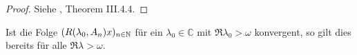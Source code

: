 
\begin{proof}
Siehe \cite{pazy_1983}, Theorem III.4.4.
\end{proof}

\begin{bem}
Ist die Folge $(R(\lambda_0, A_n)x)_{n\in\mathbb{N}}$ für ein  $\lambda_0\in\mathbb C$ mit $\mathfrak R\lambda_0 >\omega$ konvergent, so gilt dies bereits für alle $\mathfrak R\lambda >\omega$.
\end{bem}



